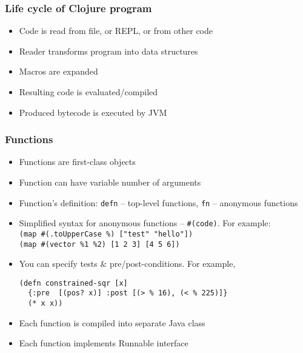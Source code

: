 \begin{frame}
  \frametitle{Life cycle of Clojure program}
  \begin{itemize}
  \item Code is read from file, or REPL, or from other code
  \item Reader transforms program into data structures
  \item Macros are expanded
  \item Resulting code is evaluated/compiled
  \item Produced bytecode is executed by JVM
  \end{itemize}
  \begin{center}
  \end{center}
\end{frame}

\begin{frame}[t,fragile]
  \frametitle{Functions}
  \begin{itemize}
  \item Functions are first-class objects
  \item Function can have variable number of arguments %
  \item Function's definition: \lstinline!defn! -- top-level functions, \lstinline!fn! --
    anonymous functions
  \item Simplified syntax for anonymous functions -- \lstinline!#(code)!. For example:\\
    \lstinline!(map #(.toUpperCase %) ["test" "hello"])!\\
    \lstinline!(map #(vector %1 %2) [1 2 3] [4 5 6])!
  \item You can specify tests \& pre/post-conditions.  For example,
\begin{lstlisting}
(defn constrained-sqr [x]
  {:pre  [(pos? x)] :post [(> % 16), (< % 225)]}
  (* x x))
\end{lstlisting}
  \item Each function is compiled into separate Java class
  \item Each function implements Runnable interface
  \end{itemize}
\end{frame}

